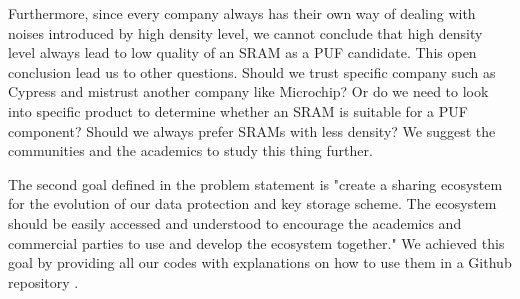 Furthermore, since every company always has their own way of dealing with noises introduced by high density level, we cannot conclude that high density level always lead to low quality of an SRAM as a PUF candidate. This open conclusion lead us to other questions. Should we trust specific company such as Cypress and mistrust another company like Microchip? Or do we need to look into specific product to determine whether an SRAM is suitable for a PUF component? Should we always prefer SRAMs with less density? We suggest the communities and the academics to study this thing further.

The second goal defined in the problem statement is "create a sharing ecosystem for the evolution of our data protection and key storage scheme. The ecosystem should be easily accessed and understood to encourage the academics and commercial parties to use and develop the ecosystem together." We achieved this goal by providing all our codes with explanations on how to use them in a Github repository \cite{repository}.
%


